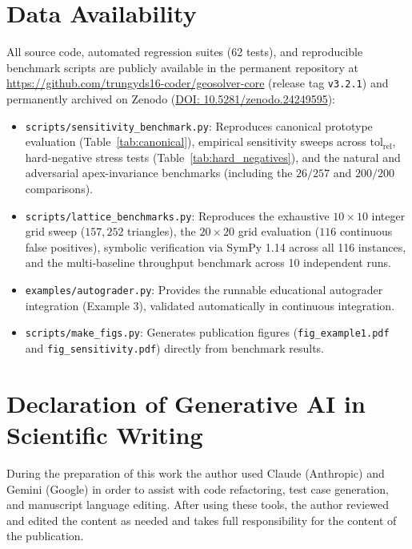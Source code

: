 \documentclass[preprint,12pt]{elsarticle}
\begin{document}
\section*{Data Availability}
All source code, automated regression suites (62 tests), and reproducible benchmark scripts are publicly available in the permanent repository at \url{https://github.com/trungyds16-coder/geosolver-core} (release tag \texttt{v3.2.1}) and permanently archived on Zenodo (\href{https://doi.org/10.5281/zenodo.24249595}{DOI: 10.5281/zenodo.24249595}):
\begin{itemize}
\item \texttt{scripts/sensitivity\_benchmark.py}: Reproduces canonical prototype evaluation (Table~\ref{tab:canonical}), empirical sensitivity sweeps across $\mathrm{tol_{rel}}$, hard-negative stress tests (Table~\ref{tab:hard_negatives}), and the natural and adversarial apex-invariance benchmarks (including the $26/257$ and $200/200$ comparisons).
\item \texttt{scripts/lattice\_benchmarks.py}: Reproduces the exhaustive $10 \times 10$ integer grid sweep ($157{,}252$ triangles), the $20 \times 20$ grid evaluation ($116$ continuous false positives), symbolic verification via SymPy 1.14 across all 116 instances, and the multi-baseline throughput benchmark across 10 independent runs.
\item \texttt{examples/autograder.py}: Provides the runnable educational autograder integration (Example 3), validated automatically in continuous integration.
\item \texttt{scripts/make\_figs.py}: Generates publication figures (\texttt{fig\_example1.pdf} and \texttt{fig\_sensitivity.pdf}) directly from benchmark results.
\end{itemize}

\section*{Declaration of Generative AI in Scientific Writing}
During the preparation of this work the author used Claude (Anthropic) and Gemini (Google) in order to assist with code refactoring, test case generation, and manuscript language editing. After using these tools, the author reviewed and edited the content as needed and takes full responsibility for the content of the publication.
\end{document}
